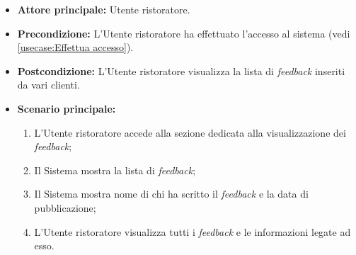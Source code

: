 \label{usecase:Visualizzazione lista feedback}
\begin{itemize}
	\item \textbf{Attore principale:} Utente ristoratore.

	\item \textbf{Precondizione:} L'Utente ristoratore ha effettuato l'accesso al sistema (vedi \autoref{usecase:Effettua accesso}).

	\item \textbf{Postcondizione:} L'Utente ristoratore visualizza la lista di \textit{feedback} inseriti da vari clienti.


	\item \textbf{Scenario principale:}
	      \begin{enumerate}
		      \item L'Utente ristoratore accede alla sezione dedicata alla visualizzazione dei \textit{feedback};

		      \item Il Sistema mostra la lista di \textit{feedback};

		      \item Il Sistema mostra nome di chi ha scritto il \textit{feedback} e la data di pubblicazione;

		      \item L'Utente ristoratore visualizza tutti i \textit{feedback} e le informazioni legate ad esso.
	      \end{enumerate}
\end{itemize}
